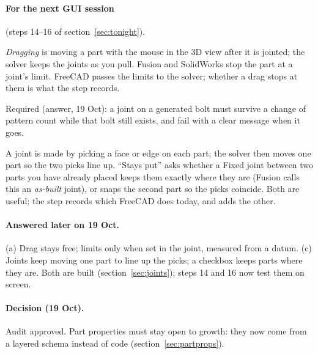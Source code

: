 \paragraph{For the next GUI session} (steps 14--16 of section~\ref{sec:tonight}).
\begin{description}[leftmargin=0pt]
  \item[(a) Limits while dragging.] \emph{Dragging} is moving a part with the mouse in the 3D view after it is
        jointed; the solver keeps the joints as you pull. Fusion and SolidWorks stop the part at a joint's limit.
        FreeCAD passes the limits to the solver; whether a drag stops at them is what the step records.
  \item[(b) Joints on pattern instances.] Required (answer, 19 Oct): a joint on a generated bolt must survive
        a change of pattern count while that bolt still exists, and fail with a clear message when it goes.
  \item[(c) Fixed joint placement.] A joint is made by picking a face or edge on each part; the solver then moves
        one part so the two picks line up. ``Stays put'' asks whether a Fixed joint between two parts you have
        already placed keeps them exactly where they are (Fusion calls this an \emph{as-built} joint), or snaps
        the second part so the picks coincide. Both are useful; the step records which FreeCAD does today, and
         adds the other.
\end{description}

\paragraph{Answered later on 19 Oct.} (a) Drag stays free; limits only when set in the joint, measured from a
datum. (c) Joints keep moving one part to line up the picks; a checkbox keeps parts where they are. Both are built
(section~\ref{sec:joints}); steps 14 and 16 now test them on screen.

\paragraph{Decision (19 Oct).} Audit approved. Part properties must stay open to growth: they now come from a
layered schema instead of code (section~\ref{sec:partprops}).
